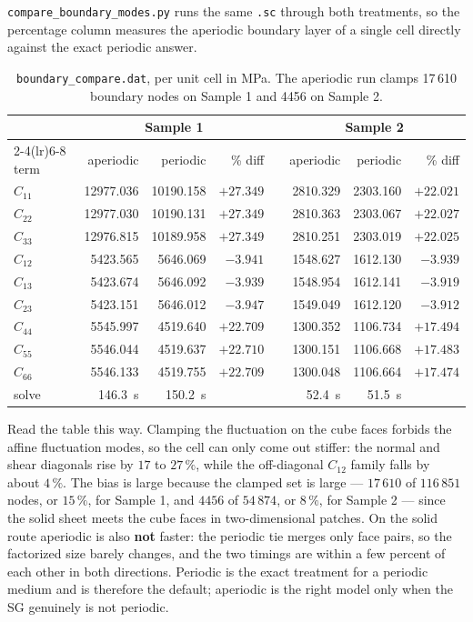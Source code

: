 \texttt{compare\_boundary\_modes.py} runs the same \texttt{.sc} through both
treatments, so the percentage column measures the aperiodic boundary layer of a
single cell directly against the exact periodic answer.

\begin{table}[htbp]
\centering
\small
\begin{tabular}{lrrrcrrr}
\toprule
& \multicolumn{3}{c}{Sample 1} & & \multicolumn{3}{c}{Sample 2} \\
\cmidrule(lr){2-4}\cmidrule(lr){6-8}
term & aperiodic & periodic & \% diff & & aperiodic & periodic & \% diff \\
\midrule
$C_{11}$ & 12977.036 & 10190.158 & $+27.349$ & & 2810.329 & 2303.160 & $+22.021$ \\
$C_{22}$ & 12977.030 & 10190.131 & $+27.349$ & & 2810.363 & 2303.067 & $+22.027$ \\
$C_{33}$ & 12976.815 & 10189.958 & $+27.349$ & & 2810.251 & 2303.019 & $+22.025$ \\
$C_{12}$ & 5423.565 & 5646.069 & $-3.941$ & & 1548.627 & 1612.130 & $-3.939$ \\
$C_{13}$ & 5423.674 & 5646.092 & $-3.939$ & & 1548.954 & 1612.141 & $-3.919$ \\
$C_{23}$ & 5423.151 & 5646.012 & $-3.947$ & & 1549.049 & 1612.120 & $-3.912$ \\
$C_{44}$ & 5545.997 & 4519.640 & $+22.709$ & & 1300.352 & 1106.734 & $+17.494$ \\
$C_{55}$ & 5546.044 & 4519.637 & $+22.710$ & & 1300.151 & 1106.668 & $+17.483$ \\
$C_{66}$ & 5546.133 & 4519.755 & $+22.709$ & & 1300.048 & 1106.664 & $+17.474$ \\
\midrule
solve & 146.3~s & 150.2~s & & & 52.4~s & 51.5~s & \\
\bottomrule
\end{tabular}
\caption{\texttt{boundary\_compare.dat}, per unit cell in MPa. The aperiodic
run clamps 17\,610 boundary nodes on Sample 1 and 4456 on Sample 2.}
\label{tab:solid-boundary}
\end{table}

Read the table this way. Clamping the fluctuation on the cube faces forbids the
affine fluctuation modes, so the cell can only come out stiffer: the normal and
shear diagonals rise by $17$ to $27\,\%$, while the off-diagonal $C_{12}$ family
falls by about $4\,\%$. The bias is large because the clamped set is large ---
$17\,610$ of $116\,851$ nodes, or $15\,\%$, for Sample 1, and $4456$ of
$54\,874$, or $8\,\%$, for Sample 2 --- since the solid sheet meets the cube
faces in two-dimensional patches. On the solid route aperiodic is also
\textbf{not} faster: the periodic tie merges only face pairs, so the factorized
size barely changes, and the two timings are within a few percent of each other
in both directions. Periodic is the exact treatment for a periodic medium and is
therefore the default; aperiodic is the right model only when the SG genuinely
is not periodic.

